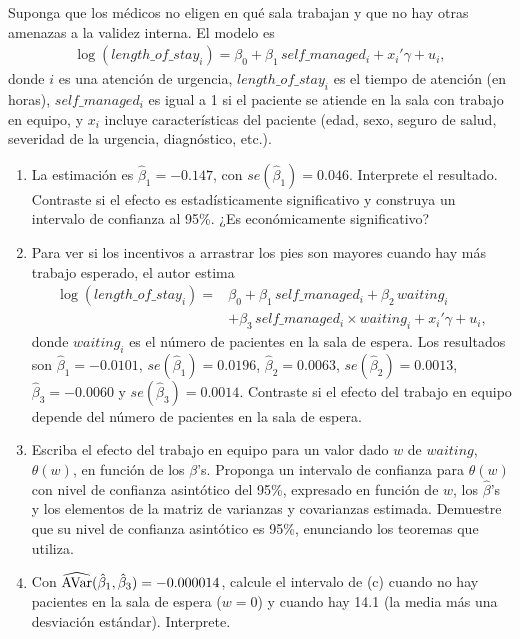 \documentclass[letterpaper,11pt]{article}
\begin{document}
\begin{enumerate}[itemsep=0.8em]
    Suponga que los médicos no eligen en qué sala trabajan y que no hay otras amenazas a la
    validez interna. El modelo es
    \begin{align*}
    \log(length\_of\_stay_{i})=\beta_0+\beta_1 \,self\_managed_{i}+x_{i}'\gamma+u_{i},
    \end{align*}
    donde $i$ es una atención de urgencia, $length\_of\_stay_i$ es el tiempo de atención (en
    horas), $self\_managed_{i}$ es igual a 1 si el paciente se atiende en la sala con trabajo
    en equipo, y $x_{i}$ incluye características del paciente (edad, sexo, seguro de salud,
    severidad de la urgencia, diagnóstico, etc.).
    \begin{enumerate}
        \item La estimación es $\hat \beta_1 = -0.147$, con $se(\hat \beta_1) = 0.046$.
              Interprete el resultado. Contraste si el efecto es estadísticamente significativo
              y construya un intervalo de confianza al 95\%. ¿Es económicamente significativo?
        \item Para ver si los incentivos a arrastrar los pies son mayores cuando hay más
              trabajo esperado, el autor estima
              \begin{align*}
              \log(length\_of\_stay_{i})=&\beta_0+\beta_1 \, self\_managed_{i}+\beta_2 \, waiting_{i}\\
              &+\beta_3 \, self\_managed_{i} \times waiting_{i} +x_{i}'\gamma+u_{i},
              \end{align*}
              donde $waiting_i$ es el número de pacientes en la sala de espera. Los resultados
              son $\hat \beta_1 = -0.0101$, $se(\hat \beta_1) = 0.0196$,
              $\hat \beta_2 = 0.0063$, $se(\hat \beta_2) = 0.0013$, $\hat \beta_3 =-0.0060$ y
              $se(\hat \beta_3) = 0.0014$. Contraste si el efecto del trabajo en equipo depende
              del número de pacientes en la sala de espera.
        \item Escriba el efecto del trabajo en equipo para un valor dado $w$ de $waiting$,
              $\theta(w)$, en función de los $\beta$'s. Proponga un intervalo de confianza para
              $\theta(w)$ con nivel de confianza asintótico del 95\%, expresado en función de
              $w$, los $\hat\beta$'s y los elementos de la matriz de varianzas y covarianzas
              estimada. Demuestre que su nivel de confianza asintótico es 95\%, enunciando los
              teoremas que utiliza.
        \item Con $\widehat{\operatorname{AVar}}(\hat \beta_1,\hat \beta_3)=-0.000014$, calcule el intervalo
              de (c) cuando no hay pacientes en la sala de espera ($w=0$) y cuando hay 14.1
              (la media más una desviación estándar). Interprete.
    \end{enumerate}
\end{enumerate}
\end{document}
